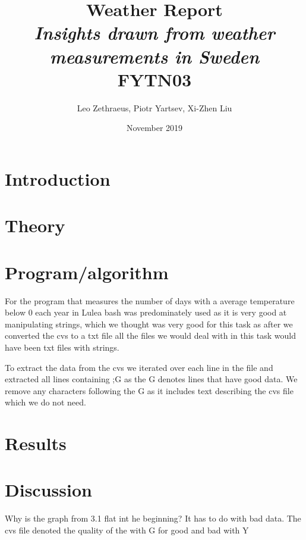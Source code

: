 \documentclass[a4paper]{article}
\begin{document}
\usepackage{graphicx}
\title{Weather Report\\\textit{Insights drawn from weather measurements in Sweden} \\ FYTN03}
\author{Leo Zethraeus, 
Piotr Yartsev, Xi-Zhen Liu} %
\date{November 2019} %
\maketitle
\newpage
\tableofcontents

\newpage

\section{Introduction}

\section{Theory}



\section{Program/algorithm}

For the program that measures the number of days with a average temperature below 0 each year in Lulea bash was predominately used as it is very good at manipulating strings,  which we thought was very good for this task as after we converted the cvs to a txt file all the files we would deal with in this task would have been txt files with strings.

To extract the data from the cvs we iterated over each line in the file and extracted all lines containing ;G as the G denotes lines that have good data. We remove any characters following the G as it includes text describing the cvs file which we do not need.  

\section{Results}
\section{Discussion}

Why is the graph from 3.1 flat int he beginning? It has to do with bad data. The cvs file denoted the quality of the with G for good and bad with Y 
\end{document}
